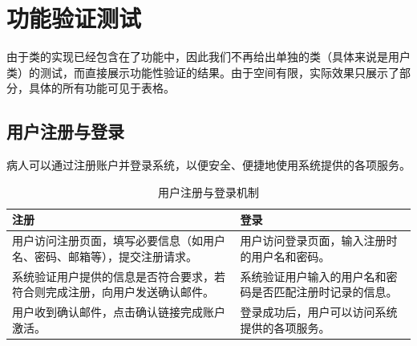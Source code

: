 \section{功能验证测试}
由于类的实现已经包含在了功能中，因此我们不再给出单独的类（具体来说是用户类）的测试，而直接展示功能性验证的结果。由于空间有限，实际效果只展示了部分，具体的所有功能可见于表格。

\subsection{用户注册与登录}

病人可以通过注册账户并登录系统，以便安全、便捷地使用系统提供的各项服务。

\begin{table}[!h]
	\centering
	\begin{tabular}{|p{6cm}|p{6cm}|}
		\hline
		\textbf{注册} & \textbf{登录} \\
		\hline
		用户访问注册页面，填写必要信息（如用户名、密码、邮箱等），提交注册请求。 & 用户访问登录页面，输入注册时的用户名和密码。 \\
		系统验证用户提供的信息是否符合要求，若符合则完成注册，向用户发送确认邮件。 & 系统验证用户输入的用户名和密码是否匹配注册时记录的信息。 \\
		用户收到确认邮件，点击确认链接完成账户激活。 & 登录成功后，用户可以访问系统提供的各项服务。 \\
		\hline
	\end{tabular}
	\caption{用户注册与登录机制}
\end{table}

